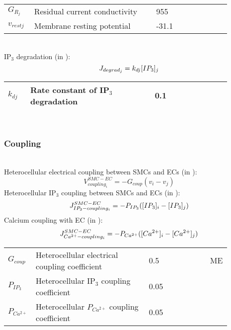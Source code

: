 %
\begin{table}[h!]
\centering
\begin{tabular}{ p{0.09\linewidth}  >{\footnotesize} p{0.5\linewidth}  >{\footnotesize} p{0.27\linewidth} >{\footnotesize} p{0.03\linewidth} }
\hline
$G_{R_{j}}$      		& Residual current conductivity										& 955 \pS			& \cite{Koenigsberger2006} \\
$v_{rest j}$      		& Membrane resting potential						 				& -31.1 \mV		& \cite{Koenigsberger2006} \\
\hline
\end{tabular}
\label{tab:JRj}
\end{table}
\\
%
IP$_{3}$ degradation (in \uMs):  
\begin{equation} \label{eq:Jdegradj}
J_{degrad_{j}}= k_{dj} [IP_{3}]_{j}
\end{equation}
%
\begin{table}[h!]
\centering
\begin{tabular}{ p{0.09\linewidth}  >{\footnotesize} p{0.5\linewidth}  >{\footnotesize} p{0.27\linewidth} >{\footnotesize} p{0.03\linewidth} }
\hline
$k_{dj}$      			& Rate constant of IP$_{3}$ degradation						 		& 0.1 \pers		& \cite{Koenigsberger2006} \\
\hline
\end{tabular}
\label{tab:Jdegradj}
\end{table}
\\
%
%
\subsubsection*{Coupling}~\\
%
Heterocellular electrical coupling between SMCs and ECs (in \mVs):
\begin{equation} \label{eq:Vcouplingi}
V_{coupling_{i}}^{SMC-EC}= -G_{coup}(v_{i}-v_{j})
\end{equation}
%
Heterocellular IP$_{3}$ coupling between SMCs and ECs (in \uMs):
\begin{equation} \label{eq:JIP3couplingi}
J_{IP_{3}-coupling_{i}}^{SMC-EC}= -P_{IP_{3}}([IP_{3}]_{i}-[IP_{3}]_{j})
\end{equation}
%
Calcium coupling with EC (in \uMs):
\begin{equation} \label{eq:JCAcouplingi}
J_{Ca^{2+}-coupling_{i}}^{SMC-EC}= -P_{Ca^{2+}}([Ca^{2+}]_{i}-[Ca^{2+}]_{j})
\end{equation}
%
\begin{table}[h!]
\centering
\begin{tabular}{ p{0.09\linewidth}  >{\footnotesize} p{0.5\linewidth}  >{\footnotesize} p{0.27\linewidth} >{\footnotesize} p{0.03\linewidth} }
\hline
$G_{coup}$      		& Heterocellular electrical coupling coefficient		& 0.5 \pers	& ME \\
$P_{IP_{3}}$      		& Heterocellular IP$_{3}$ coupling coefficient	& 0.05 \pers	&  \cite{Koenigsberger2006} \\
$P_{Ca^{2+}}$      		& Heterocellular $P_{Ca^{2+}}$ coupling coefficient	& 0.05 \pers	&  \cite{Koenigsberger2006} \\
\hline
\end{tabular}
\label{tab:JCA3couplingi}
\end{table}
%
